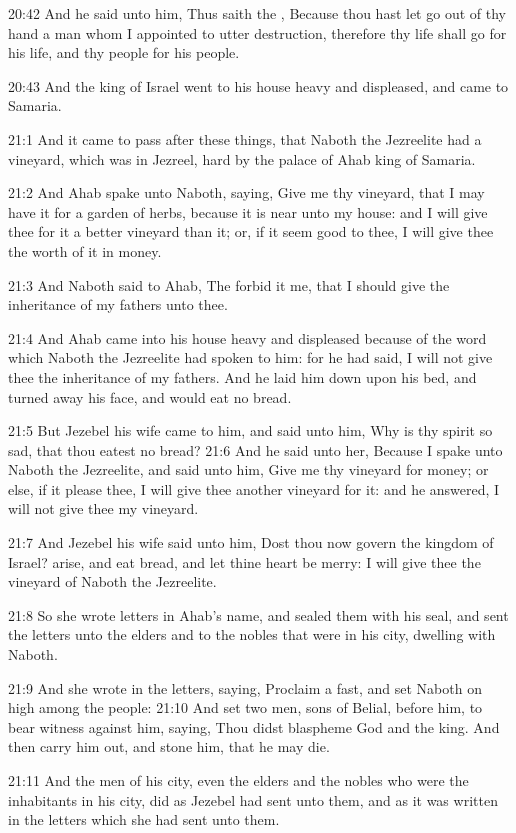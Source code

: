 20:42 And he said unto him, Thus saith the \LORD, Because thou hast let
go out of thy hand a man whom I appointed to utter destruction,
therefore thy life shall go for his life, and thy people for his
people.

20:43 And the king of Israel went to his house heavy and displeased,
and came to Samaria.

21:1 And it came to pass after these things, that Naboth the
Jezreelite had a vineyard, which was in Jezreel, hard by the palace of
Ahab king of Samaria.

21:2 And Ahab spake unto Naboth, saying, Give me thy vineyard, that I
may have it for a garden of herbs, because it is near unto my house:
and I will give thee for it a better vineyard than it; or, if it seem
good to thee, I will give thee the worth of it in money.

21:3 And Naboth said to Ahab, The \LORD forbid it me, that I should
give the inheritance of my fathers unto thee.

21:4 And Ahab came into his house heavy and displeased because of the
word which Naboth the Jezreelite had spoken to him: for he had said, I
will not give thee the inheritance of my fathers. And he laid him down
upon his bed, and turned away his face, and would eat no bread.

21:5 But Jezebel his wife came to him, and said unto him, Why is thy
spirit so sad, that thou eatest no bread?  21:6 And he said unto her,
Because I spake unto Naboth the Jezreelite, and said unto him, Give me
thy vineyard for money; or else, if it please thee, I will give thee
another vineyard for it: and he answered, I will not give thee my
vineyard.

21:7 And Jezebel his wife said unto him, Dost thou now govern the
kingdom of Israel? arise, and eat bread, and let thine heart be merry:
I will give thee the vineyard of Naboth the Jezreelite.

21:8 So she wrote letters in Ahab's name, and sealed them with his
seal, and sent the letters unto the elders and to the nobles that were
in his city, dwelling with Naboth.

21:9 And she wrote in the letters, saying, Proclaim a fast, and set
Naboth on high among the people: 21:10 And set two men, sons of
Belial, before him, to bear witness against him, saying, Thou didst
blaspheme God and the king. And then carry him out, and stone him,
that he may die.

21:11 And the men of his city, even the elders and the nobles who were
the inhabitants in his city, did as Jezebel had sent unto them, and as
it was written in the letters which she had sent unto them.

